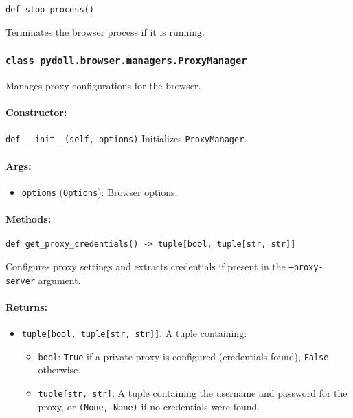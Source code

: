 \documentclass{article}
\begin{document}
\noindent\texttt{def stop\_process()}

\noindent Terminates the browser process if it is running.

\subsubsection*{\texttt{class pydoll.browser.managers.ProxyManager}}
\noindent Manages proxy configurations for the browser.

\paragraph{Constructor:}
\noindent\texttt{def \_\_init\_\_(self, options)}
\noindent Initializes \texttt{ProxyManager}.

\paragraph{Args:}
\begin{itemize}
    \item \texttt{options} (\texttt{Options}): Browser options.
\end{itemize}

\paragraph{Methods:}
\noindent\texttt{def get\_proxy\_credentials() -> tuple[bool, tuple[str, str]]}

\noindent Configures proxy settings and extracts credentials if present in the \texttt{--proxy-server} argument.

\paragraph{Returns:}
\begin{itemize}
    \item \texttt{tuple[bool, tuple[str, str]]}: A tuple containing:
          \begin{itemize}
              \item \texttt{bool}: \texttt{True} if a private proxy is configured (credentials found), \texttt{False} otherwise.
              \item \texttt{tuple[str, str]}: A tuple containing the username and password for the proxy, or \texttt{(None, None)} if no credentials were found.
          \end{itemize}
\end{itemize}
\end{document}
